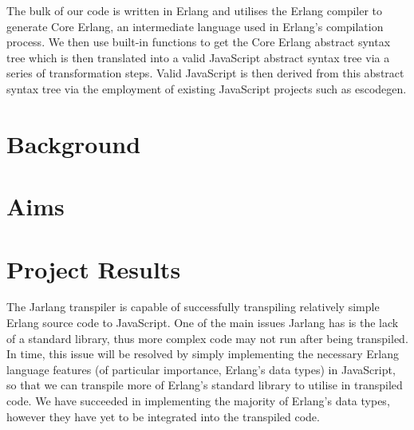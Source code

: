 \documentclass[twoside,12pt,titlepage,a4paper]{article}
\begin{document}
	The bulk of our code is written in Erlang and utilises the Erlang compiler to generate Core Erlang, an intermediate language used in Erlang’s compilation process. We then use built-in functions to get the Core Erlang abstract syntax tree which is then translated into a valid JavaScript abstract syntax tree via a series of transformation steps. Valid JavaScript is then derived from this abstract syntax tree via the employment of existing JavaScript projects such as escodegen.
	
\section{Background}
\label{Background}


\section{Aims}
\label{Aims}


\section{Project Results}
\label{Results}


The Jarlang transpiler is capable of successfully transpiling relatively simple Erlang source code to JavaScript. One of the main issues Jarlang has is the lack of a standard library, thus more complex code may not run after being transpiled. In time, this issue will be resolved by simply implementing the necessary Erlang language features (of particular importance, Erlang’s data types) in JavaScript, so that we can transpile more of Erlang’s standard library to utilise in transpiled code. We have succeeded in implementing the majority of Erlang’s data types, however they have yet to be integrated into the transpiled code.
\end{document}
